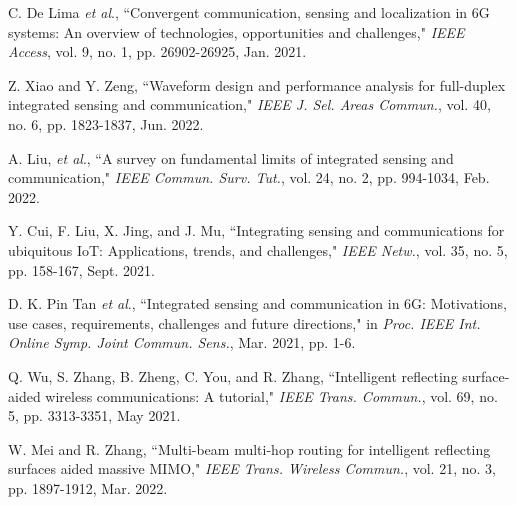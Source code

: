\documentclass[10pt,final,doublecolumn]{IEEEtran}
\begin{document}
\begin{thebibliography}{1}
C. De Lima \emph{et al}., ``Convergent communication, sensing and localization in 6G systems: An overview of technologies, opportunities and challenges," \emph{IEEE Access}, vol. 9, no. 1, pp. 26902-26925, Jan. 2021.

Z. Xiao and Y. Zeng, ``Waveform design and performance analysis for full-duplex integrated sensing and communication," \emph{IEEE J. Sel. Areas Commun.}, vol. 40, no. 6, pp. 1823-1837, Jun. 2022.

A. Liu, \emph{et al}., ``A survey on fundamental limits of integrated sensing and communication," \emph{IEEE Commun. Surv. Tut.}, vol. 24, no. 2, pp. 994-1034, Feb. 2022.

Y. Cui, F. Liu, X. Jing, and J. Mu, ``Integrating sensing and communications for ubiquitous IoT: Applications, trends, and challenges," \emph{IEEE Netw.}, vol. 35, no. 5, pp. 158-167, Sept. 2021.

D. K. Pin Tan \emph{et al}., ``Integrated sensing and communication in 6G: Motivations, use cases, requirements, challenges and future directions," in \emph{Proc. IEEE Int. Online Symp. Joint Commun. Sens.}, Mar. 2021, pp. 1-6.

Q. Wu, S. Zhang, B. Zheng, C. You, and R. Zhang, ``Intelligent reflecting surface-aided wireless communications: A tutorial," \emph{IEEE Trans. Commun.}, vol. 69, no. 5, pp. 3313-3351, May 2021.

W. Mei and R. Zhang, ``Multi-beam multi-hop routing for intelligent reflecting surfaces aided massive MIMO," \emph{IEEE Trans. Wireless Commun.}, vol. 21, no. 3, pp. 1897-1912, Mar. 2022.





\end{thebibliography}
\end{document}
